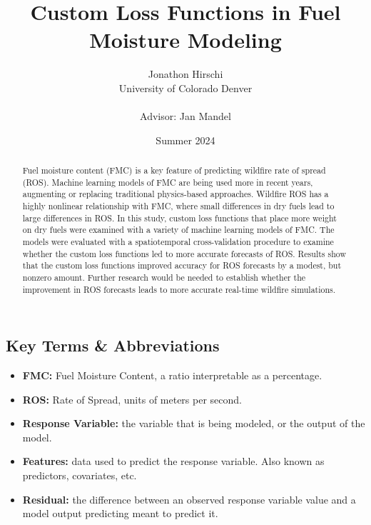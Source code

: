 \documentclass[11pt]{article}%
\begin{document}
\title{Custom Loss Functions in Fuel Moisture Modeling}
\author{
    \begin{tabular}[t]{c}
        Jonathon Hirschi \\
        University of Colorado Denver \\
        \\
        Advisor: Jan Mandel
    \end{tabular}
}

\date{Summer 2024}
\maketitle

\begin{abstract}
Fuel moisture content (FMC) is a key feature of predicting wildfire rate of spread (ROS). Machine learning models of FMC are being used more in recent years, augmenting or replacing traditional physics-based approaches. Wildfire ROS has a highly nonlinear relationship with FMC, where small differences in dry fuels lead to large differences in ROS. In this study, custom loss functions that place more weight on dry fuels were examined with a variety of machine learning models of FMC. The models were evaluated with a spatiotemporal cross-validation procedure to examine whether the custom loss functions led to more accurate forecasts of ROS. Results show that the custom loss functions improved accuracy for ROS forecasts by a modest, but nonzero amount. Further research would be needed to establish whether the improvement in ROS forecasts leads to more accurate real-time wildfire simulations.
\end{abstract}

\subsection*{Key Terms \& Abbreviations}
\begin{itemize}
    \item \textbf{FMC:} Fuel Moisture Content, a ratio interpretable as a percentage.
    \item \textbf{ROS:} Rate of Spread, units of meters per second.
    \item \textbf{Response Variable:} the variable that is being modeled, or the output of the model.
    \item \textbf{Features:} data used to predict the response variable. Also known as predictors, covariates, etc.
    \item \textbf{Residual:} the difference between an observed response variable value and a model output predicting meant to predict it.
\end{itemize}
\end{document}
